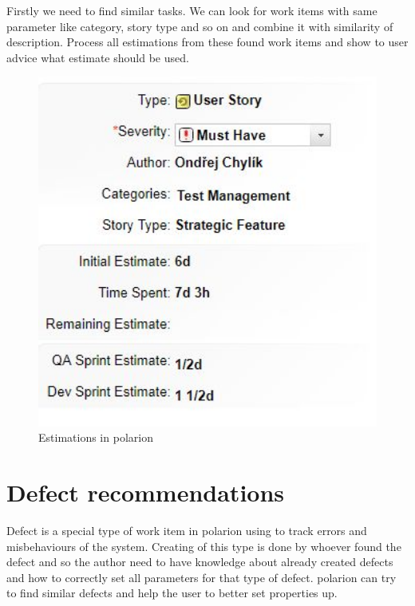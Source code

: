\documentclass[thesis=M,english]{FITthesis}[2012/06/26]
\begin{document}
Firstly we need to find similar tasks. We can look for work items with same parameter like category, story type and so on and combine it with similarity of description. Process all estimations from these found work items and show to user advice what estimate should be used.

\begin{figure}[h!]\centering
	\includegraphics[width=1\textwidth]{pictures/polarion_estimation}
	\caption{Estimations in \acrshort{polarion}}\label{fig:polarion_estimation}
\end{figure}

\section{Defect recommendations}

Defect is a special type of work item in \acrshort{polarion} using to track errors and misbehaviours of the system. Creating of this type is done by whoever found the defect and so the author need to have knowledge about already created defects and how to correctly set all parameters for that type of defect. \acrshort{polarion} can try to find similar defects and help the user to better set properties up.\\
\end{document}
